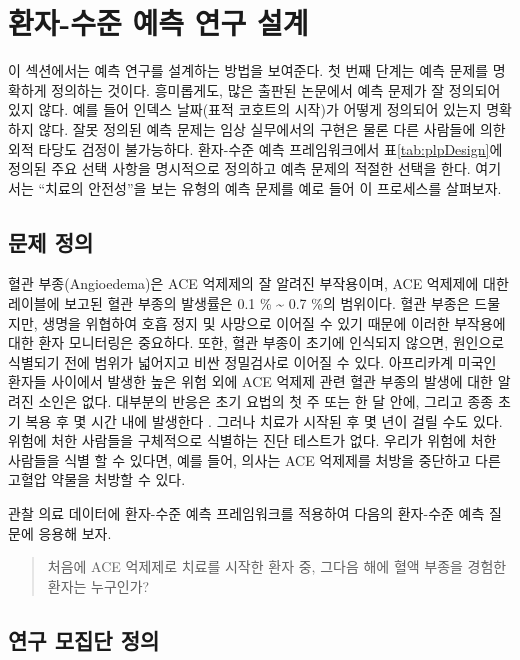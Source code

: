 \documentclass[11pt]{book}
\theoremstyle{definition}
\theoremstyle{definition}
\theoremstyle{definition}
\theoremstyle{remark}
\begin{document}
\section{환자-수준 예측 연구 설계}\label{----}

이 섹션에서는 예측 연구를 설계하는 방법을 보여준다. 첫 번째 단계는 예측
문제를 명확하게 정의하는 것이다. 흥미롭게도, 많은 출판된 논문에서 예측
문제가 잘 정의되어 있지 않다. 예를 들어 인덱스 날짜(표적 코호트의
시작)가 어떻게 정의되어 있는지 명확하지 않다. 잘못 정의된 예측 문제는
임상 실무에서의 구현은 물론 다른 사람들에 의한 외적 타당도 검정이
불가능하다. 환자-수준 예측 프레임워크에서 표\ref{tab:plpDesign}에 정의된
주요 선택 사항을 명시적으로 정의하고 예측 문제의 적절한 선택을 한다.
여기서는 ``치료의 안전성''을 보는 유형의 예측 문제를 예로 들어 이
프로세스를 살펴보자. 

\subsection{문제 정의}\label{--3}

혈관 부종(Angioedema)은 ACE 억제제의 잘 알려진 부작용이며, ACE 억제제에
대한 레이블에 보고된 혈관 부종의 발생률은 0.1 \% \textasciitilde{} 0.7
\%의 범위이다. \citep{byrd_2006} 혈관 부종은 드물지만, 생명을 위협하여
호흡 정지 및 사망으로 이어질 수 있기 때문에 이러한 부작용에 대한 환자
모니터링은 중요하다. \citep{norman_2013} 또한, 혈관 부종이 초기에
인식되지 않으면, 원인으로 식별되기 전에 범위가 넓어지고 비싼 정밀검사로
이어질 수 있다. \citep{norman_2013, thompson_1993} 아프리카계 미국인
환자들 사이에서 발생한 높은 위험 외에 ACE 억제제 관련 혈관 부종의 발생에
대한 알려진 소인은 없다. \citep{byrd_2006} 대부분의 반응은 초기 요법의
첫 주 또는 한 달 안에, 그리고 종종 초기 복용 후 몇 시간 내에 발생한다
\citep{circardi_2004}. 그러나 치료가 시작된 후 몇 년이 걸릴 수도 있다.
\citep{mara_1996} 위험에 처한 사람들을 구체적으로 식별하는 진단 테스트가
없다. 우리가 위험에 처한 사람들을 식별 할 수 있다면, 예를 들어, 의사는
ACE 억제제를 처방을 중단하고 다른 고혈압 약물을 처방할 수
있다. 

관찰 의료 데이터에 환자-수준 예측 프레임워크를 적용하여 다음의 환자-수준
예측 질문에 응용해 보자.

\begin{quote}
처음에 ACE 억제제로 치료를 시작한 환자 중, 그다음 해에 혈액 부종을
경험한 환자는 누구인가?
\end{quote}

\subsection{연구 모집단 정의}\label{--}
\end{document}
